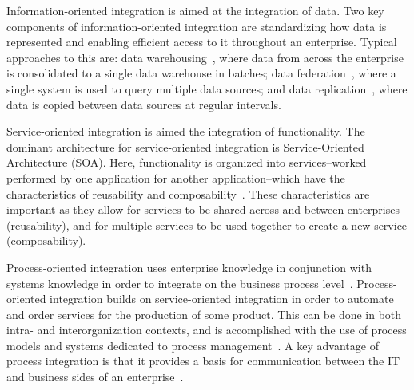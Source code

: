 Information-oriented integration is aimed at the integration of data. Two key components of information-oriented integration are standardizing how data is represented and enabling efficient access to it throughout an enterprise. Typical approaches to this are: data warehousing~\cite{kimball2006data}, where data from across the enterprise is consolidated to a single data warehouse in batches; data federation~\cite{haas2002data}, where a single system is used to query multiple data sources; and data replication~\cite{wiesmann2000database}, where data is copied between data sources at regular intervals. 

Service-oriented integration is aimed the integration of functionality. The dominant architecture for service-oriented integration is Service-Oriented Architecture (SOA). Here, functionality is organized into services--worked performed by one application for another application--which have the characteristics of  reusability and composability~\cite{roshen2009soa}. These characteristics are important as they allow for services to be shared across and between enterprises (reusability), and for multiple services to be used together to create a new service (composability). 

Process-oriented integration uses enterprise knowledge in conjunction with systems knowledge in order to integrate on the business process level~\cite{Vernadat200215}. Process-oriented integration builds on service-oriented integration in order to automate and order services for the production of some product. This can be done in both intra- and interorganization contexts, and is accomplished with the use of process models and systems dedicated to process management~\cite{dumas2005process}. A key advantage of process integration is that it provides a basis for communication between the IT and business sides of an enterprise~\cite{dumas2005process}.